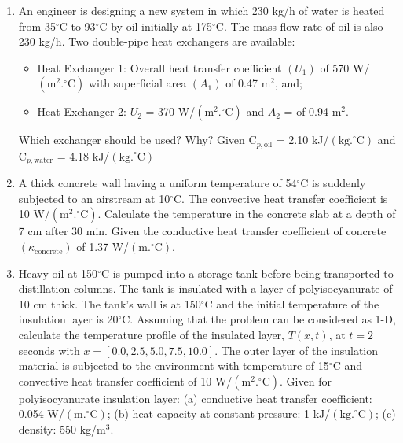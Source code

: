 \documentclass[calculator,fluidstables,allquestions,datasheet]{exam}
\begin{document}
\begin{question}
%
\begin{enumerate}
%
\item\label{HE_Exam1} An engineer is designing a new system in which 230 kg/h of water is heated from 35$^{\circ}$C to 93$^{\circ}$C by oil initially at 175$^{\circ}$C. The mass flow rate of oil is also 230 kg/h. Two double-pipe heat exchangers are available:
\begin{itemize}
   \item Heat Exchanger 1: Overall heat transfer coefficient $\left(U_{1}\right)$ of 570 W/$\left(\text{m}^{2}.^{\circ}\text{C}\right)$ with superficial area $\left(A_{1}\right)$ of 0.47 m$^{2}$, and;
   \item Heat Exchanger 2: $U_{2}$ = 370 W/$\left(\text{m}^{2}.^{\circ}\text{C}\right)$ and $A_{2}$ = of 0.94 m$^{2}$.
\end{itemize}
Which exchanger should be used? Why?
Given C$_{p,\text{oil}}$ = 2.10 kJ/$\left(\text{kg.}^{\circ}\text{C}\right)$ and C$_{p,\text{water}}$ = 4.18 kJ/$\left(\text{kg.}^{\circ}\text{C}\right)$
%

\item\label{Transient_Exam1} A thick concrete wall having a uniform temperature of 54$^{\circ}$C is suddenly subjected to an airstream at 10$^{\circ}$C. The convective heat transfer coefficient is 10 W/$\left(\text{m}^{2}.^{\circ}\text{C}\right)$. Calculate the temperature in the concrete slab at a depth of 7 cm after 30 min. Given the conductive heat transfer coefficient of concrete $\left(\kappa_{\text{concrete}}\right)$ of 1.37 W/$\left(\text{m.}^{\circ}\text{C}\right)$.

\item\label{Transient_Exam2_FDM} Heavy oil at 150$^{\circ}$C is pumped into a storage tank before being transported to distillation columns. The tank is insulated with a layer of polyisocyanurate of 10 cm thick. The tank's wall is at 150$^{\circ}$C and the initial temperature of the insulation layer is 20$^{\circ}$C. Assuming that the problem can be considered as 1-D, calculate the temperature profile of the insulated layer, $T\left(\underline{x},t\right)$, at $t = 2$ seconds with $\underline{x}=\left[0.0, 2.5, 5.0, 7.5, 10.0\right]$. The outer layer of the insulation material is subjected to the environment with temperature of 15$^{\circ}$C and convective heat transfer coefficient of 10 W/$\left(\text{m}^{2}.^{\circ}\text{C}\right)$. Given for polyisocyanurate insulation layer: (a) conductive heat transfer coefficient: 0.054 W/$\left(\text{m.}^{\circ}\text{C}\right)$; (b) heat capacity at constant pressure: 1 kJ/$\left(\text{kg.}^{\circ}\text{C}\right)$; (c) density: 550 kg/m$^{3}$.


\end{enumerate}
\end{question}
\end{document}
